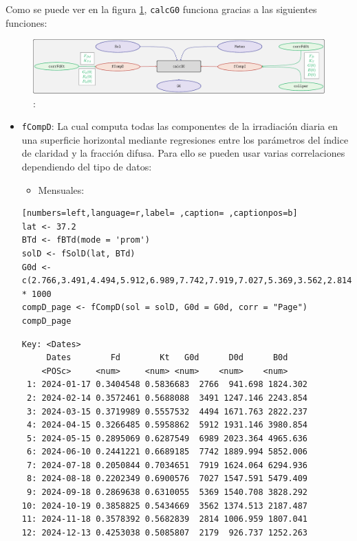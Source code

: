 Como se puede ver en la figura \ref{fig:calcg0}, \texttt{calcG0} funciona gracias a las siguientes funciones:
\begin{figure}[]
\centering
\includegraphics[keepaspectratio,width=\textwidth,height=0.5\textheight]{figuras/calcg0.pdf}
\caption{:\label{fig:calcg0}}
\end{figure}
\begin{itemize}
\item \texttt{fCompD}: La cual computa todas las componentes de la irradiación diaria en una superficie horizontal mediante regresiones entre los parámetros del índice de claridad y la fracción difusa.
Para ello se pueden usar varias correlaciones dependiendo del tipo de datos:
\begin{itemize}
\item Mensuales:
\end{itemize}
\begin{lstlisting}[numbers=left,language=r,label= ,caption= ,captionpos=b]
lat <- 37.2
BTd <- fBTd(mode = 'prom')
solD <- fSolD(lat, BTd)
G0d <- c(2.766,3.491,4.494,5.912,6.989,7.742,7.919,7.027,5.369,3.562,2.814,2.179) * 1000
compD_page <- fCompD(sol = solD, G0d = G0d, corr = "Page")
compD_page
\end{lstlisting}

\begin{verbatim}
Key: <Dates>
	 Dates        Fd        Kt   G0d      D0d      B0d
	<POSc>     <num>     <num> <num>    <num>    <num>
 1: 2024-01-17 0.3404548 0.5836683  2766  941.698 1824.302
 2: 2024-02-14 0.3572461 0.5688088  3491 1247.146 2243.854
 3: 2024-03-15 0.3719989 0.5557532  4494 1671.763 2822.237
 4: 2024-04-15 0.3266485 0.5958862  5912 1931.146 3980.854
 5: 2024-05-15 0.2895069 0.6287549  6989 2023.364 4965.636
 6: 2024-06-10 0.2441221 0.6689185  7742 1889.994 5852.006
 7: 2024-07-18 0.2050844 0.7034651  7919 1624.064 6294.936
 8: 2024-08-18 0.2202349 0.6900576  7027 1547.591 5479.409
 9: 2024-09-18 0.2869638 0.6310055  5369 1540.708 3828.292
10: 2024-10-19 0.3858825 0.5434669  3562 1374.513 2187.487
11: 2024-11-18 0.3578392 0.5682839  2814 1006.959 1807.041
12: 2024-12-13 0.4253038 0.5085807  2179  926.737 1252.263
\end{verbatim}


\end{itemize}
